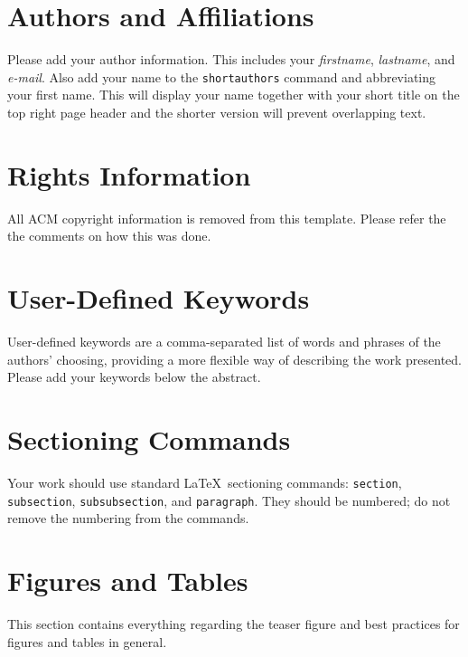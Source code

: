 \documentclass[sigchi]{acmart}
\begin{document}
\section{Authors and Affiliations}
Please add your author information. This includes your
\emph{firstname}, \emph{lastname}, and \emph{e-mail}. Also add your name to the 
\verb|shortauthors| command and abbreviating your first name. This will display your name together with your short title on the top right page header and the shorter version will prevent overlapping text.

\section{Rights Information}
All ACM copyright information is removed from this template. Please refer the the comments on how this was done.

\section{User-Defined Keywords}
User-defined keywords are a comma-separated list of words and phrases
of the authors' choosing, providing a more flexible way of describing
the work presented. Please add your keywords below the abstract.

\section{Sectioning Commands}
Your work should use standard \LaTeX\ sectioning commands:
\verb|section|, \verb|subsection|, \verb|subsubsection|, and
\verb|paragraph|. They should be numbered; do not remove the numbering
from the commands.

\section{Figures and Tables}
This section contains everything regarding the teaser figure and best practices for figures and tables in general.
\end{document}
